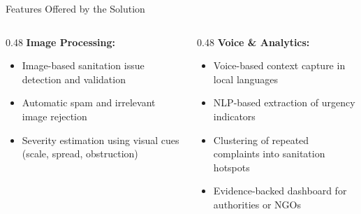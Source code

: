\documentclass[aspectratio=169]{beamer}
\begin{document}
\begin{frame}{Features Offered by the Solution}

\begin{columns}[T]
\begin{column}{0.48\textwidth}
\textbf{Image Processing:}
\begin{itemize}
    \item Image-based sanitation issue detection and validation
    \item Automatic spam and irrelevant image rejection
    \item Severity estimation using visual cues (scale, spread, obstruction)
\end{itemize}
\end{column}

\begin{column}{0.48\textwidth}
\textbf{Voice \& Analytics:}
\begin{itemize}
    \item Voice-based context capture in local languages
    \item NLP-based extraction of urgency indicators
    \item Clustering of repeated complaints into sanitation hotspots
    \item Evidence-backed dashboard for authorities or NGOs
\end{itemize}
\end{column}
\end{columns}

\end{frame}
\end{document}
